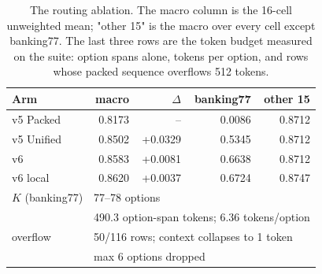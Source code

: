 \begin{table}[t]
\centering
\small
\setlength{\tabcolsep}{2.5pt}
\caption{The routing ablation. The macro column is the 16-cell unweighted
mean; "other 15" is the macro over every cell except banking77. The last three
rows are the token budget measured on the suite: option spans alone, tokens per
option, and rows whose packed sequence overflows 512 tokens.}
\label{tab:routing}
\begin{tabular}{lrrrr}
\toprule
Arm & macro & $\Delta$ & banking77 & other 15 \\
\midrule
v5 Packed & 0.8173 & -- & 0.0086 & 0.8712 \\
v5 Unified & 0.8502 & +0.0329 & 0.5345 & 0.8712 \\
v6 & 0.8583 & +0.0081 & 0.6638 & 0.8712 \\
v6 local & 0.8620 & +0.0037 & 0.6724 & 0.8747 \\
\midrule
$K$ (banking77) & \multicolumn{4}{l}{77--78 options} \\
 & \multicolumn{4}{l}{490.3 option-span tokens; 6.36 tokens/option} \\
overflow & \multicolumn{4}{l}{50/116 rows; context collapses to 1 token} \\
 & \multicolumn{4}{l}{max 6 options dropped} \\
\bottomrule
\end{tabular}
\end{table}
